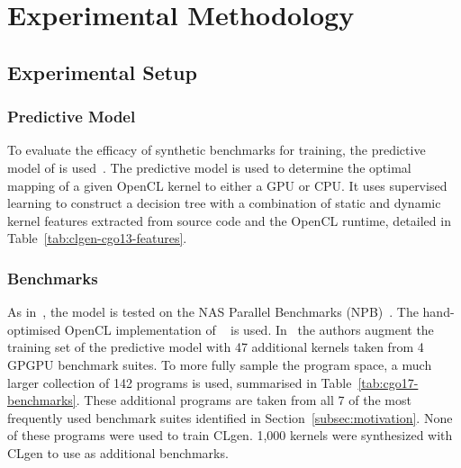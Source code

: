 \section{Experimental Methodology}
\label{sec:clgen-eval-methodology}

\subsection{Experimental Setup}\label{subsec:experimental-setup}

\subsubsection{Predictive Model}

To evaluate the efficacy of synthetic benchmarks for training, the predictive model of \citeauthor{Grewe2013} is used~\cite{Grewe2013}. The predictive model is used to determine the optimal mapping of a given OpenCL kernel to either a GPU or CPU. It uses supervised learning to construct a decision tree with a combination of static and dynamic kernel features extracted from source code and the OpenCL runtime, detailed in Table~\ref{tab:clgen-cgo13-features}.

\begin{table}
	\centering%
	\caption[\emph{Grewe et al.\ }model features]{%
		Features used by \emph{Grewe et al.\ }to predict CPU/GPU mapping of OpenCL kernels. The features are extracted using a custom analysis pass based using LLVM.
	}%
	\label{tab:clgen-cgo13-features} %
\end{table}

\subsubsection{Benchmarks}

As in~\cite{Grewe2013}, the model is tested on the NAS Parallel Benchmarks (NPB)~\cite{Bailey1991a}. The hand-optimised OpenCL implementation of \citeauthor{Seo2011}~\cite{Seo2011} is used. In~\cite{Grewe2013} the authors augment the training set of the predictive model with 47 additional kernels taken from 4 GPGPU benchmark suites. To more fully sample the program space, a much larger collection of 142 programs is used, summarised in Table~\ref{tab:cgo17-benchmarks}. These additional programs are taken from all 7 of the most frequently used benchmark suites identified in Section~\ref{subsec:motivation}. None of these programs were used to train CLgen. 1,000 kernels were synthesized with CLgen to use as additional benchmarks.


